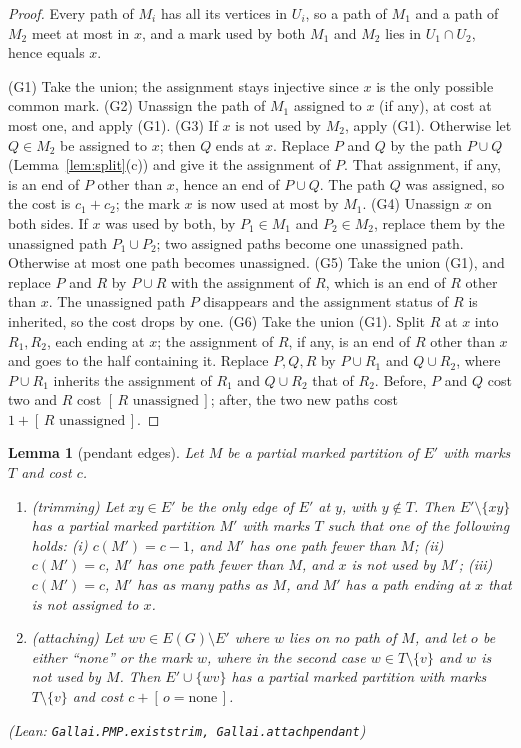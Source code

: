 \documentclass[11pt]{amsart}
\newtheorem{lemma}[theorem]{Lemma}
\theoremstyle{definition}
\theoremstyle{remark}
\renewcommand{\_}{\oldunderscore\allowbreak}
\newcommand{\leanst}[1]{\par{\raggedright\small\textup{(Lean: \texttt{#1})}\par}}
\newcommand{\ind}[1]{[\,#1\,]}
\begin{document}
\begin{proof}
Every path of $M_i$ has all its vertices in $U_i$, so a path of $M_1$ and a path of $M_2$ meet at
most in $x$, and a mark used by both $M_1$ and $M_2$ lies in $U_1\cap U_2$, hence equals $x$.

(G1) Take the union; the assignment stays injective since $x$ is the only possible common mark.
(G2) Unassign the path of $M_1$ assigned to $x$ (if any), at cost at most one, and apply (G1).
(G3) If $x$ is not used by $M_2$, apply (G1). Otherwise let $Q\in M_2$ be assigned to $x$; then $Q$
ends at $x$. Replace $P$ and $Q$ by the path $P\cup Q$ (Lemma~\ref{lem:split}(c)) and give it the
assignment of $P$. That assignment, if any, is an end of $P$ other than $x$, hence an end of $P\cup
Q$. The path $Q$ was assigned, so the cost is $c_1+c_2$; the mark $x$ is now used at most by $M_1$.
(G4) Unassign $x$ on both sides. If $x$ was used by both, by $P_1\in M_1$ and $P_2\in M_2$, replace
them by the unassigned path $P_1\cup P_2$; two assigned paths become one unassigned path. Otherwise
at most one path becomes unassigned.
(G5) Take the union (G1), and replace $P$ and $R$ by $P\cup R$ with the assignment of $R$, which is
an end of $R$ other than $x$. The unassigned path $P$ disappears and the assignment status of $R$ is
inherited, so the cost drops by one.
(G6) Take the union (G1). Split $R$ at $x$ into $R_1,R_2$, each ending at $x$; the assignment of $R$,
if any, is an end of $R$ other than $x$ and goes to the half containing it. Replace $P,Q,R$ by
$P\cup R_1$ and $Q\cup R_2$, where $P\cup R_1$ inherits the assignment of $R_1$ and $Q\cup R_2$ that
of $R_2$. Before, $P$ and $Q$ cost two and $R$ cost $\ind{R\text{ unassigned}}$; after, the two new
paths cost $1+\ind{R\text{ unassigned}}$.
\end{proof}

\begin{lemma}[pendant edges]\label{lem:pendant-edge}
Let $M$ be a partial marked partition of $E'$ with marks $T$ and cost $c$.
\begin{enumerate}[label=\textup{(\alph*)}]
\item \emph{(trimming)} Let $xy\in E'$ be the only edge of $E'$ at $y$, with $y\notin T$. Then
$E'\setminus\{xy\}$ has a partial marked partition $M'$ with marks $T$ such that one of the following
holds: (i) $c(M')=c-1$, and $M'$ has one path fewer than $M$; (ii) $c(M')=c$, $M'$ has one path
fewer than $M$, and $x$ is not used by $M'$; (iii) $c(M')=c$, $M'$ has as many paths as $M$, and
$M'$ has a path ending at $x$ that is not assigned to $x$.
\item \emph{(attaching)} Let $wv\in E(G)\setminus E'$ where $w$ lies on no path of $M$, and let
$o$ be either ``none'' or the mark $w$, where in the second case $w\in T\setminus\{v\}$ and $w$ is not
used by $M$. Then $E'\cup\{wv\}$ has a partial marked partition with marks $T\setminus\{v\}$ and cost
$c+\ind{o=\text{none}}$.
\end{enumerate}
\leanst{Gallai.PMP.exists\_trim, Gallai.attach\_pendant}
\end{lemma}
\end{document}
